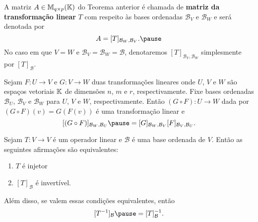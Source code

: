\documentclass{beamer}
\begin{document}
\begin{frame}
    \begin{definicao}
        A matriz $A \in \mathbb{M}_{q\times p}(\mathbb{K})$ do Teorema anterior \pause é chamada de \textbf{matriz da transformação linear} \pause $T$ com respeito às bases ordenadas $\mathcal{B}_V$ e $\mathcal{B}_W$ \pause e será denotada por\pause
        \[
            A = [T]_{\mathcal{B}_{W},\mathcal{B}_{V}}.\pause
        \]
        No caso em que $V = W$ \pause e $\mathcal{B}_V = \mathcal{B}_W = \mathcal{B}$, \pause denotaremos $[T]_{\mathcal{B}_{V},\mathcal{B}_{W}}$ \pause simplesmente por $[T]_\mathcal{B}$.
    \end{definicao}
\end{frame}

\begin{frame}
    \begin{teorema}\label{matriz_da_composicao_de_transformacoes}
        Sejam $F \colon U \to V$ \pause e $G \colon V \to W$ \pause duas transformações lineares onde $U$, $V$ e $W$ \pause são espaços vetoriais $\mathbb{K}$ \pause de dimensões $n$, $m$ e $r$, respectivamente. \pause Fixe bases ordenadas $\mathcal{B}_U$, \pause $\mathcal{B}_V$ \pause e $\mathcal{B}_W$ \pause para $U$, $V$ e $W$, respectivamente. \pause Então $(G \circ F) \colon U \to W$ \pause dada por $(G\circ F)(v) = G(F(v))$ \pause é uma transformação linear e\pause
        \[
            [(G \circ F)]_{{\mathcal{B}_W},{\mathcal{B}_U}} \pause = [G]_{{\mathcal{B}_W},{\mathcal{B}_V}}[F]_{{\mathcal{B}_V},{\mathcal{B}_U}}.
        \]
    \end{teorema}
\end{frame}

\begin{frame}
    \begin{teorema}
        Sejam $T \colon V \to V$ é um operador linear \pause e $\mathcal{B}$ é uma base ordenada de $V$. \pause Então as seguintes afirmações são equivalentes:\pause
        \begin{enumerate}[label={\roman*})]
            \item $T$ é injetor\pause

            \vspace{1cm}

            \item $[T]_\mathcal{B}$ é invertível.\pause
        \end{enumerate}

        \vspace{.2cm}

        Além disso, se valem essas condições equivalentes, então\pause
        \[
            [T^{-1}]_\mathcal{B} \pause = [T]_\mathcal{B}^{-1}.
        \]
    \end{teorema}
\end{frame}
\end{document}
